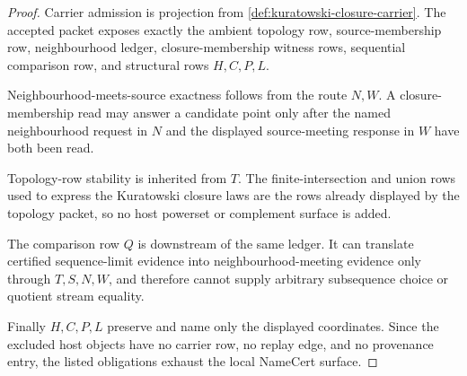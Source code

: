 \begin{proof}
Carrier admission is projection from \autoref{def:kuratowski-closure-carrier}. The accepted packet exposes exactly the ambient topology row, source-membership row, neighbourhood ledger, closure-membership witness rows, sequential comparison row, and structural rows $H,C,P,L$.

Neighbourhood-meets-source exactness follows from the route $N,W$. A closure-membership read may answer a candidate point only after the named neighbourhood request in $N$ and the displayed source-meeting response in $W$ have both been read.

Topology-row stability is inherited from $T$. The finite-intersection and union rows used to express the Kuratowski closure laws are the rows already displayed by the topology packet, so no host powerset or complement surface is added.

The comparison row $Q$ is downstream of the same ledger. It can translate certified sequence-limit evidence into neighbourhood-meeting evidence only through $T,S,N,W$, and therefore cannot supply arbitrary subsequence choice or quotient stream equality.

Finally $H,C,P,L$ preserve and name only the displayed coordinates. Since the excluded host objects have no carrier row, no replay edge, and no provenance entry, the listed obligations exhaust the local NameCert surface.
\end{proof}

